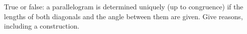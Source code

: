 True or false: a parallelogram is determined uniquely (up to congruence) if the lengths of both diagonals and the angle between them are given. Give reasons, including a construction.
